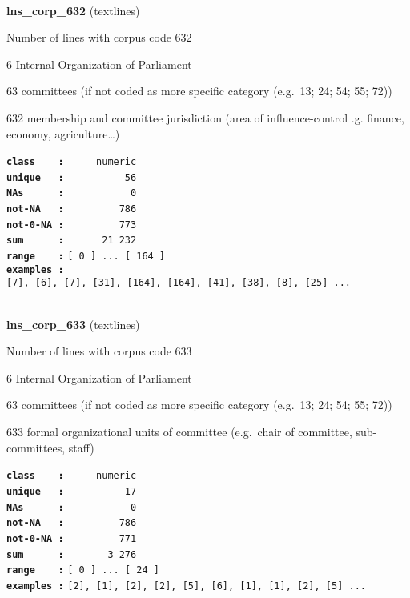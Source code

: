 \documentclass[]{article}
\begin{document}
~

\textbf{lns\_corp\_632} (textlines)

Number of lines with corpus code 632

6 Internal Organization of Parliament

63 committees (if not coded as more specific category (e.g.~13; 24; 54;
55; 72))

632 membership and committee jurisdiction (area of influence-control .g.
finance, economy, agriculture\ldots{})

\textbf{\texttt{class\ \ \ \ :}} \texttt{~~~~~numeric}\\
\textbf{\texttt{unique\ \ \ :}} \texttt{~~~~~~~~~~56}\\
\textbf{\texttt{NAs\ \ \ \ \ \ :}} \texttt{~~~~~~~~~~~0}\\
\textbf{\texttt{not-NA\ \ \ :}} \texttt{~~~~~~~~~786}\\
\textbf{\texttt{not-0-NA\ :}} \texttt{~~~~~~~~~773}\\
\textbf{\texttt{sum\ \ \ \ \ \ :}} \texttt{~~~~~~21~232}\\
\textbf{\texttt{range\ \ \ \ :}}
\texttt{{[}\ 0\ {]}\ ...\ {[}\ 164\ {]}}\\
\textbf{\texttt{examples\ :}}
\texttt{{[}7{]},\ {[}6{]},\ {[}7{]},\ {[}31{]},\ {[}164{]},\ {[}164{]},\ {[}41{]},\ {[}38{]},\ {[}8{]},\ {[}25{]}\ ...}\\

~

\textbf{lns\_corp\_633} (textlines)

Number of lines with corpus code 633

6 Internal Organization of Parliament

63 committees (if not coded as more specific category (e.g.~13; 24; 54;
55; 72))

633 formal organizational units of committee (e.g.~chair of committee,
sub-committees, staff)

\textbf{\texttt{class\ \ \ \ :}} \texttt{~~~~~numeric}\\
\textbf{\texttt{unique\ \ \ :}} \texttt{~~~~~~~~~~17}\\
\textbf{\texttt{NAs\ \ \ \ \ \ :}} \texttt{~~~~~~~~~~~0}\\
\textbf{\texttt{not-NA\ \ \ :}} \texttt{~~~~~~~~~786}\\
\textbf{\texttt{not-0-NA\ :}} \texttt{~~~~~~~~~771}\\
\textbf{\texttt{sum\ \ \ \ \ \ :}} \texttt{~~~~~~~3~276}\\
\textbf{\texttt{range\ \ \ \ :}}
\texttt{{[}\ 0\ {]}\ ...\ {[}\ 24\ {]}}\\
\textbf{\texttt{examples\ :}}
\texttt{{[}2{]},\ {[}1{]},\ {[}2{]},\ {[}2{]},\ {[}5{]},\ {[}6{]},\ {[}1{]},\ {[}1{]},\ {[}2{]},\ {[}5{]}\ ...}\\
\end{document}
